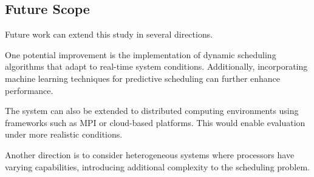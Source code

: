 \documentclass[12pt,a4paper]{article}
\begin{document}
\subsection*{Future Scope}

Future work can extend this study in several directions.

One potential improvement is the implementation of dynamic scheduling algorithms that adapt to real-time system conditions. Additionally, incorporating machine learning techniques for predictive scheduling can further enhance performance.

The system can also be extended to distributed computing environments using frameworks such as MPI or cloud-based platforms. This would enable evaluation under more realistic conditions.

Another direction is to consider heterogeneous systems where processors have varying capabilities, introducing additional complexity to the scheduling problem.
\end{document}
